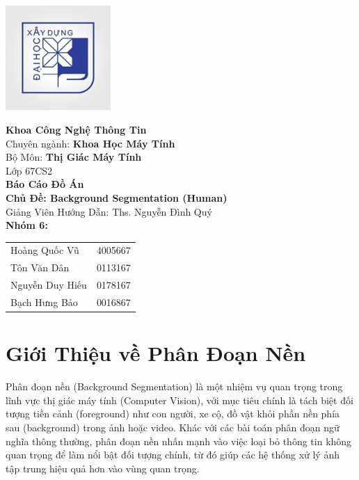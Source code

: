 \documentclass[12pt]{report}
\begin{document}
\begin{titlepage}
    \begin{flushright}
        \includegraphics[width=4cm]{logo.jpg}
    \end{flushright}

    \vspace*{1cm}
    \begin{center}
        {\bfseries\Large Khoa Công Nghệ Thông Tin}\\[0.5cm]
        Chuyên ngành: {\bfseries Khoa Học Máy Tính}\\[0.5cm]
        Bộ Môn: {\bfseries Thị Giác Máy Tính}\\
        Lớp 67CS2\\[1.5cm]
        {\bfseries\LARGE Báo Cáo Đồ Án}\\[0.8cm]
        {\bfseries\large Chủ Đề: Background Segmentation (Human)}\\[0.5cm]
        Giảng Viên Hướng Dẫn: Ths. Nguyễn Đình Quý\\[1cm]
        {\large\textbf{Nhóm 6:}}\\[0.5cm]
        \begin{tabular}{ll}
            Hoàng Quốc Vũ      & 4005667 \\
            Tôn Văn Dân        & 0113167 \\
            Nguyễn Duy Hiếu    & 0178167 \\
            Bạch Hưng Bảo      & 0016867 \\
        \end{tabular}
    \end{center}
    \vfill
\end{titlepage}


\newpage

\chapter*{Giới Thiệu về Phân Đoạn Nền}
Phân đoạn nền (Background Segmentation) là một nhiệm vụ quan trọng trong lĩnh vực thị giác máy tính (Computer Vision), với mục tiêu chính là tách biệt đối tượng tiền cảnh (foreground) như con người, xe cộ, đồ vật khỏi phần nền phía sau (background) trong ảnh hoặc video. Khác với các bài toán phân đoạn ngữ nghĩa thông thường, phân đoạn nền nhấn mạnh vào việc loại bỏ thông tin không quan trọng để làm nổi bật đối tượng chính, từ đó giúp các hệ thống xử lý ảnh tập trung hiệu quả hơn vào vùng quan trọng.
\end{document}
